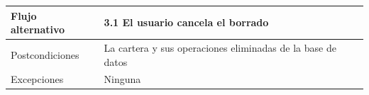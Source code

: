 \documentclass[12pt, a4paper]{book}
\begin{document}
\begin{table}[htbp]
\begin{tabular}{|l|l|}
		Flujo alternativo & 3.1 El usuario cancela el borrado                                                                                                                                                                                                                                                                                                                                \\ \hline
		Postcondiciones   & La cartera y sus operaciones eliminadas de la base de datos                                                                                                                                                                                                                                                                                                      \\ \hline
		Excepciones       & Ninguna                                                                                                                                                                                                                                                                                                                                                          \\ \hline
	\end{tabular}
\end{table}
\end{document}

